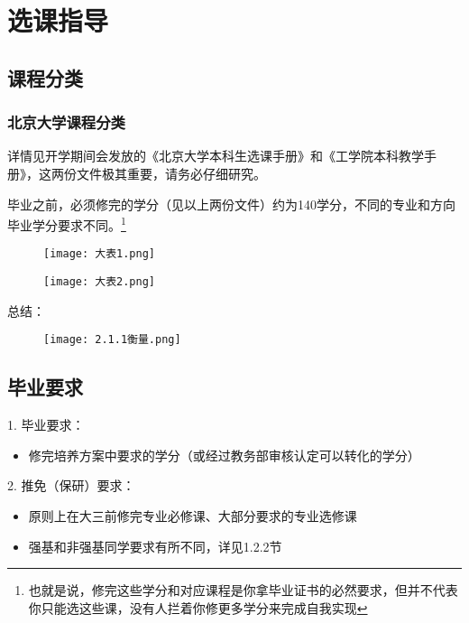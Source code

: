 \documentclass[11pt,oneside]{book}
\begin{document}
	
	
	
	
	
	
	
\chapter{选课指导}
\section{课程分类}
\subsection{北京大学课程分类}
详情见开学期间会发放的《北京大学本科生选课手册》和《工学院本科教学手册》，这两份文件极其重要，请务必仔细研究。

毕业之前，必须修完的学分（见以上两份文件）约为140学分，不同的专业和方向毕业学分要求不同。\footnote{也就是说，修完这些学分和对应课程是你拿毕业证书的必然要求，但并不代表你只能选这些课，没有人拦着你修更多学分来完成自我实现}

\begin{figure}[htbp]
	\centering
	\texttt{[image: 大表1.png]}
\end{figure}

\begin{figure}[htbp]
	\centering
	\texttt{[image: 大表2.png]}
\end{figure}



总结：
\begin{figure}[htbp]
	\centering
	\texttt{[image: 2.1.1衡量.png]}
\end{figure}

\section{毕业要求}
1. 毕业要求：

\begin{itemize}
	\item 修完培养方案中要求的学分（或经过教务部审核认定可以转化的学分）
\end{itemize}

2. 推免（保研）要求：

\begin{itemize}
	\item 原则上在大三前修完专业必修课、大部分要求的专业选修课
	\item 强基和非强基同学要求有所不同，详见1.2.2节
\end{itemize}
\end{document}
